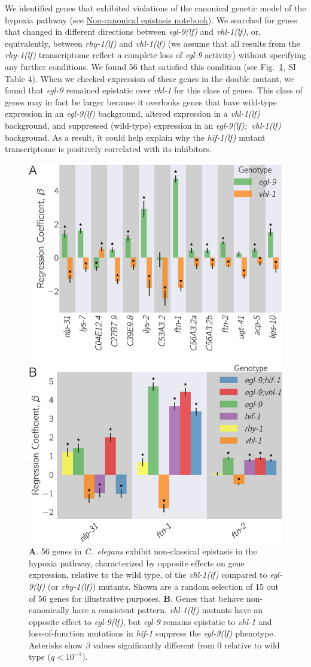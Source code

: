 \documentclass[9pt,twocolumn,twoside]{pnas-new}
\newcommand{\qval}[1]{$q<10^{-#1}$}
\newcommand{\cel}{\emph{C.~elegans}}
\newcommand{\gene}[1]{\mbox{\emph{#1}}}
\newcommand{\egl}{\gene{egl-9(lf)}}
\newcommand{\rhy}{\gene{rhy-1(lf)}}
\newcommand{\vhl}{\gene{vhl-1(lf)}}
\newcommand{\eglvhl}{\gene{egl-9(lf); vhl-1(lf)}}
\newcommand{\hif}{\gene{hif-1(lf)}}
\newcommand{\hifohtargets}{56}
\begin{document}
We identified genes that exhibited violations of the canonical genetic
model of the hypoxia pathway (see
\href{https://wormlabcaltech.github.io/mprsq/analysis_notebooks/7_hifoh.html}
{Non-canonical epistasis notebook}). We searched for genes that changed in different
directions between \egl{} and \vhl{}, or, equivalently, between \rhy{} and
\vhl{} (we assume that all results from the \rhy{} transcriptome reflect a
complete loss of \gene{egl-9} activity) without specifying any further
conditions. We found \hifohtargets{} that satisfied this condition (see
Fig.~\ref{fig:hif1oh}, SI Table 4). When we checked expression of
these genes in the double mutant, we found that \gene{egl-9} remained epistatic
over \gene{vhl-1} for this class of genes. This class of genes may in fact be
larger because it overlooks genes that have wild-type expression in an
\egl{} background, altered expression in a \vhl{} background, and suppressed
(wild-type) expression  in an \eglvhl{} background.
\color{purple}
As a result, it could help
explain why the \hif{} mutant transcriptome is positively correlated with its
inhibitors.
\color{black}

\begin{figure}[tbhp]
  \centering
  \includegraphics[width=.4\textwidth]{../figs/hif1oh_epistasis.pdf}
  \caption{
    \textbf{A}. \hifohtargets{} genes in \cel{} exhibit non-classical epistasis
    in the hypoxia pathway, characterized by opposite effects on gene expression,
    relative to the wild type, of the \vhl{} compared to \egl{} (or \rhy{})
    mutants. Shown are a random selection of 15 out of \hifohtargets{} genes for
    illustrative purposes. \textbf{B}. Genes that behave non-canonically  have a
    consistent pattern. \vhl{} mutants have an opposite effect to \egl{}, but
    \gene{egl-9} remains epistatic to \gene{vhl-1} and loss-of-function
    mutations in \gene{hif-1} suppress the \egl{} phenotype. Asterisks show
    $\beta$ values significantly different from 0 relative to wild type
    (\qval{1}).
  }
\label{fig:hif1oh}
\end{figure}
\end{document}
